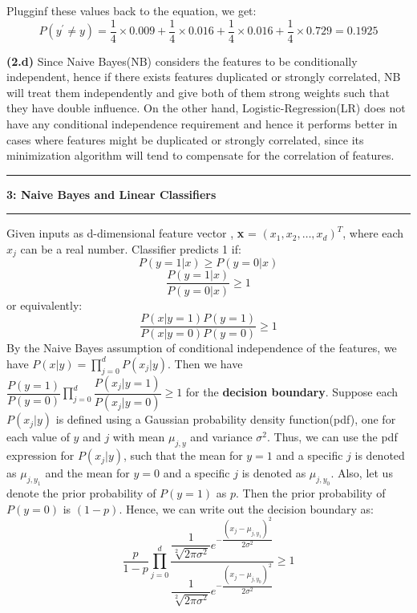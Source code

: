 \documentclass{article}
\newcommand\question[2]{\vspace{.25in}\hrule\textbf{#1: #2}\hrule\vspace{.10in}}
\renewcommand\part[1]{\vspace{.10in}\textbf{(#1)}}
\begin{document}
	Plugginf these values back to the equation, we get: 
	\[P(y^\prime \neq y) = \dfrac{1}{4}\times 0.009 + \dfrac{1}{4}\times 0.016 + \dfrac{1}{4}\times 0.016 + \dfrac{1}{4}\times 0.729 = 0.1925\]

	\part{2.d} Since Naive Bayes(NB) considers the features to be conditionally independent, hence if there exists features duplicated or strongly correlated, NB will treat them independently and give both of them strong weights such that they have double influence. On the other hand, Logistic-Regression(LR) does not have any conditional independence requirement and hence it performs better in cases where features might be duplicated or strongly correlated, since its minimization algorithm will tend to compensate for the correlation of features.

	\question{3}{Naive Bayes and Linear Classifiers}
	Given inputs as d-dimensional feature vector , \textbf {x} = $(x_1,x_2,\dots , x_d)^T$, where each $x_j$ can be a real number. Classifier predicts 1 if:
	\[ P(y=1 | x) \geq P(y=0 | x) \]
	\[ \dfrac{P(y=1 | x)}{P(y=0 | x)} \geq 1 \]
	or equivalently:
	\[ \dfrac{P(x|y=1)P(y=1)}{P(x|y=0)P(y=0)} \geq 1\]
	By the Naive Bayes assumption of conditional independence of the features, we have $P(x|y) = \prod_{j=0}^d P(x_j|y)$. Then we have $\dfrac{P(y=1)}{P(y=0)}\prod_{j=0}^d \dfrac{P(x_j|y=1)}{P(x_j|y=0)} \geq 1$ for the \textbf {decision boundary}. Suppose each $P(x_j|y)$ is defined using a Gaussian probability density function(pdf), one for each value of $y$ and $j$ with mean $\mu_{j,y}$ and variance $\sigma^2$. Thus, we can use the pdf expression for $P(x_j|y)$, such that the mean for $y=1$ and a specific $j$ is denoted as $\mu_{j,y_1}$ and the mean for $y=0$ and a specific $j$ is denoted as $\mu_{j,y_0}$. Also, let us denote the prior probability of $P(y=1)$ as $p$. Then the prior probability of $P(y=0)$ is $(1-p)$.
 Hence, we can write out the decision boundary as:
	\[\dfrac{p}{1-p} \prod_{j=0}^d \dfrac{\dfrac{1}{\sqrt[2]{2\pi \sigma^2}}e^{-\dfrac{(x_j - \mu_{j,y_1})^2}{2\sigma^2}}}{\dfrac{1}{\sqrt[2]{2\pi \sigma^2}}e^{-\dfrac{(x_j - \mu_{j,y_0})^2}{2\sigma^2}}} \geq 1\]
\end{document}
